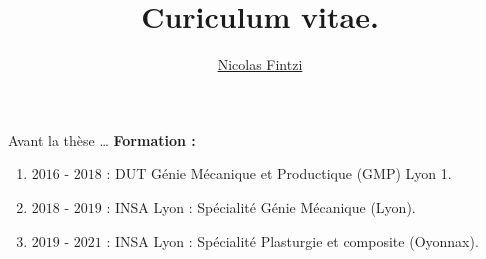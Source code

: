 \documentclass{sintefbeamer}
\title{Curiculum vitae.}
\author{\underline{Nicolas Fintzi}}
\begin{document}
\maketitle
\begin{frame}{Avant la th\`ese \ldots}
  \textbf{Formation :}
  \begin{enumerate}
      \item $2016$ - $2018$ : DUT G\'enie M\'ecanique et Productique (GMP) Lyon 1.
      \item $2018$ - $2019$ : INSA Lyon : Sp\'ecialit\'e G\'enie M\'ecanique (Lyon).
      \item $2019$ - $2021$ : INSA Lyon : Sp\'ecialit\'e Plasturgie et composite (Oyonnax).
    \end{enumerate}
\end{frame}

  
  
  
\end{document}
